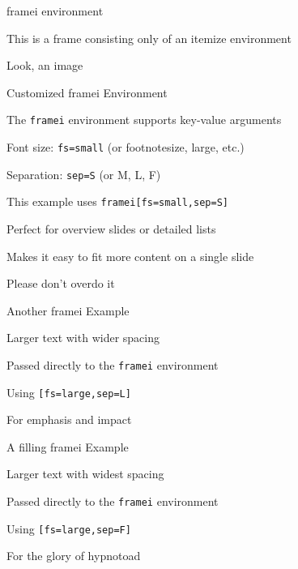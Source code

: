\documentclass[11pt,compress,t,notes=noshow, xcolor=table]{beamer}
\begin{document}
\begin{framei}{framei environment}
  \item This is a frame consisting only of an itemize environment
  
  
  \item Look, an image
\end{framei}


\begin{framei}[fs=small,sep=S]{Customized framei Environment}
  \item The \texttt{framei} environment supports key-value arguments
  \item Font size: \texttt{fs=small} (or footnotesize, large, etc.)
  \item Separation: \texttt{sep=S} (or M, L, F)
  \item This example uses \texttt{framei[fs=small,sep=S]}
  \item Perfect for overview slides or detailed lists
  \item Makes it easy to fit more content on a single slide
  \item Please don't overdo it
\end{framei}


\begin{framei}[fs=large,sep=L]{Another framei Example}
  \item Larger text with wider spacing
  \item Passed directly to the \texttt{framei} environment
  \item Using \texttt{[fs=large,sep=L]}
  \item For emphasis and impact
\end{framei}


\begin{framei}[fs=large,sep=F]{A filling framei Example}
  \item Larger text with widest spacing
  \item Passed directly to the \texttt{framei} environment
  \item Using \texttt{[fs=large,sep=F]}
  \item For the glory of hypnotoad
\end{framei}
\end{document}
